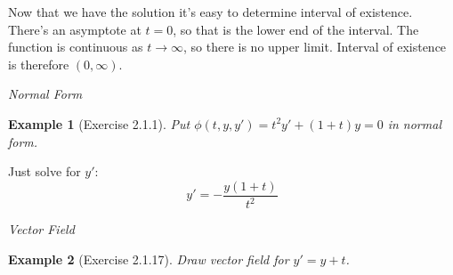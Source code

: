 \documentclass[14pt]{article}
\newtheorem{ex}{Example}
\begin{document}
Now that we have the solution it's easy to determine interval of existence. There's an asymptote at
$t=0$, so that is the lower end of the interval. The function is continuous as $t \to \infty$, so
there is no upper limit. Interval of existence is therefore $(0,\infty)$.

\emph{Normal Form}
\begin{ex}[Exercise 2.1.1] Put $\phi(t,y,y') = t^2 y' + (1+t) y = 0$ in normal form. \end{ex}
Just solve for $y'$: 
\[y' = - \frac{y(1+t)}{t^2} \]


\emph{Vector Field}
\begin{ex}[Exercise 2.1.17] Draw vector field for $y' = y+ t$. \end{ex}
\end{document}
